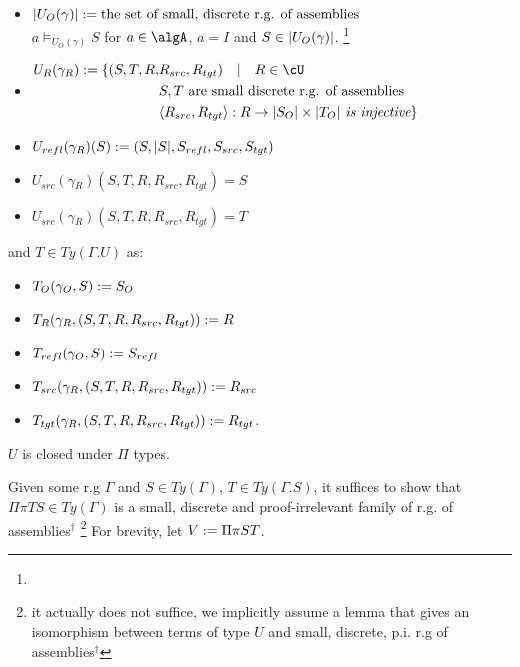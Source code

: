 \documentclass[12pt,a4paper]{article}
\def\src{_{src}}
\def\rfl{_{refl}}
\def\tgt{_{tgt}}
\renewcommand{\O}{_{O}}\alwaysmath{O}
\newcommand{\R}{\ensuremath{_{R}}}
\begin{document}
\begin{itemize}
  \item $\carr{U\O(\gamma)} \define \text{the set of small, discrete r.g. of assemblies}$ \\
   $a \vDash_{U\O(\gamma)} S$ for $a \in \algA$, $a = I$ and $S \in \carr{U\O(\gamma)}$. \footnote{}
   
  \item $\begin{aligned}
  U\R(\gamma\R) \define \{(S,T, R, & R\src, R\tgt) \quad|\quad R \in \cU \\
  & S,T \text{ are small discrete r.g. of assemblies} \\
  & \langle R\src, R\tgt\rangle : R \to \carr{S\O} \times \carr{T\O} \textit { is injective} \}
  \end{aligned}$
  
  \item $U\rfl(\gamma\R)(S) \define (S, \carr{S}, S\rfl, S\src, S\tgt)$
  
  \item $U\src(\gamma\R)(S, T, R, R\src, R\tgt) = S$
  
  \item $U\src(\gamma\R)(S, T, R, R\src, R\tgt) = T$
\end{itemize}
and $T \in Ty(\Gamma . U)$ as:
\begin{itemize}
  \item $T\O(\gamma\O, S) \define S\O$
  \item $T\R(\gamma\R, (S,T, R, R\src, R\tgt)) \define R$
  \item $T\rfl(\gamma\O, S) \define S\rfl$
  \item $T\src(\gamma\R, (S,T, R, R\src, R\tgt)) \define R\src$
  \item $T\tgt(\gamma\R, (S,T, R, R\src, R\tgt)) \define R\tgt$.
\end{itemize}
\begin{claim} $U$ is closed under $\Pi$ types.
\end{claim}
Given some r.g $\Gamma$ and $S \in Ty(\Gamma)$, $T \in Ty(\Gamma.S)$, it suffices to show that $\Pi \pi T S \in Ty(\Gamma)$ is a small, discrete and proof-irrelevant family of r.g. of assemblies$^\dagger$ \footnote{it actually does not suffice, we implicitly assume a lemma that gives an isomorphism between terms of type $U$ and small, discrete, p.i. r.g of assemblies$^\dagger$} For brevity, let $V := \Pi \pi S T$.\\
\end{document}
